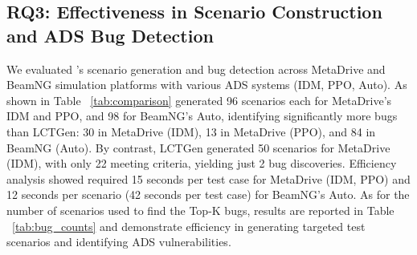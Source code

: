 \subsection{RQ3: Effectiveness in Scenario Construction and ADS Bug Detection}
We evaluated {\tool}'s scenario generation and bug detection across MetaDrive and BeamNG simulation platforms with various ADS systems (IDM, PPO, Auto). As shown in Table ~\ref{tab:comparison} {\tool} generated 96 scenarios each for MetaDrive’s IDM and PPO, and 98 for BeamNG’s Auto, identifying significantly more bugs than LCTGen: 30 in MetaDrive (IDM), 13 in MetaDrive (PPO), and 84 in BeamNG (Auto). By contrast, LCTGen generated 50 scenarios for MetaDrive (IDM), with only 22 meeting criteria, yielding just 2 bug discoveries. Efficiency analysis showed {\tool} required 15 seconds per test case for MetaDrive (IDM, PPO) and 12 seconds per scenario (42 seconds per test case) for BeamNG’s Auto. As for the number of scenarios used to find the Top-K bugs, results are reported in Table ~\ref{tab:bug_counts} and demonstrate {\tool} efficiency in generating targeted test scenarios and identifying ADS vulnerabilities.

